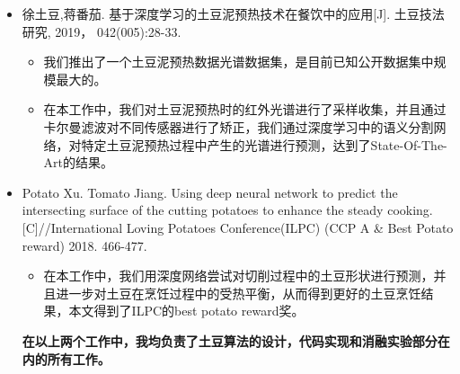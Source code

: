 
\begin{itemize}
	\item  徐土豆,蒋番茄. 基于深度学习的土豆泥预热技术在餐饮中的应用[J]. 土豆技法研究, 2019， 042(005):28-33. 
	\begin{itemize}
		\item 我们推出了一个土豆泥预热数据光谱数据集，是目前已知公开数据集中规模最大的。
		
		\item 在本工作中，我们对土豆泥预热时的红外光谱进行了采样收集，并且通过卡尔曼滤波对不同传感器进行了矫正，我们通过深度学习中的语义分割网络，对特定土豆泥预热过程中产生的光谱进行预测，达到了State-Of-The-Art的结果。
	\end{itemize}
	
	\item Potato Xu. Tomato Jiang. Using deep neural network to predict the intersecting surface of the cutting potatoes to enhance the steady cooking.[C]//International Loving Potatoes Conference(ILPC) (CCP A \& Best Potato reward) 2018. 466-477.
	 \begin{itemize}
		\item 在本工作中，我们用深度网络尝试对切削过程中的土豆形状进行预测，并且进一步对土豆在烹饪过程中的受热平衡，从而得到更好的土豆烹饪结果，本文得到了ILPC的best potato reward奖。
	\end{itemize}
	\faInfo \textbf{ 在以上两个工作中，我均负责了土豆算法的设计，代码实现和消融实验部分在内的所有工作。}

\end{itemize}
